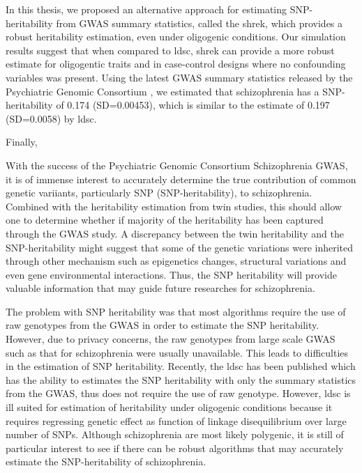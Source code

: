 \documentclass[12pt]{book}
\begin{document}
	
	
	In this thesis, we proposed an alternative approach for estimating \gls{SNP}-heritability from \gls{GWAS} summary statistics, called the \gls{shrek}, which provides a robust heritability estimation, even under oligogenic conditions.
	Our simulation results suggest that when compared to \gls{ldsc}, \gls{shrek} can provide a more robust estimate for oligogentic traits and in case-control designs where no confounding variables was present.
	Using the latest \gls{GWAS} summary statistics released by the Psychiatric Genomic Consortium , we estimated that schizophrenia has a \gls{SNP}-heritability of 0.174 (SD=0.00453), which is similar to the estimate of 0.197 (SD=0.0058) by \gls{ldsc}.
	
	Finally, 
	
	
	
	With the success of the Psychiatric Genomic Consortium Schizophrenia \gls{GWAS}, it is of immense interest to accurately determine the true contribution of common genetic variiants, particularly \gls{SNP} (\gls{SNP}-heritability), to schizophrenia.
	Combined with the heritability estimation from twin studies, this should allow one to determine whether if majority of the heritability has been captured through the \gls{GWAS} study.
	A discrepancy between the twin heritability and the \gls{SNP}-heritability might suggest that some of the genetic variations were inherited through other mechanism such as epigenetics changes, structural variations and even gene environmental interactions.
	Thus, the \gls{SNP} heritability will provide valuable information that may guide future researches for schizophrenia.
	
	The problem with \gls{SNP} heritability was that most algorithms require the use of raw genotypes from the \gls{GWAS} in order to estimate the \gls{SNP} heritability.
	However, due to privacy concerns, the raw genotypes from large scale \gls{GWAS} such as that for schizophrenia were usually unavailable. 
	This leads to difficulties in the estimation of \gls{SNP} heritability.
	Recently, the \gls{ldsc} has been published which has the ability to estimates the \gls{SNP} heritability with only the summary statistics from the \gls{GWAS}, thus does not require the use of raw genotype.
	However, \gls{ldsc} is ill suited for estimation of heritability under oligogenic conditions because it requires regressing genetic effect as function of linkage disequilibrium over large number of \glspl{SNP}.
	Although schizophrenia are most likely polygenic, it is still of particular interest to see if there can be robust algorithms that may accurately estimate the \gls{SNP}-heritability of schizophrenia.
	
\end{document}
